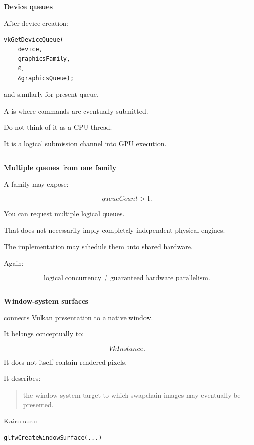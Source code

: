\textbf{Device queues}

After device creation:

\begin{verbatim}
vkGetDeviceQueue(
    device,
    graphicsFamily,
    0,
    &graphicsQueue);
\end{verbatim}

and similarly for present queue.

A  is where commands are eventually submitted.

Do not think of it as a CPU thread.

It is a logical submission channel into GPU execution.

\begin{center}\rule{0.5\linewidth}{0.5pt}\end{center}

\textbf{Multiple queues from one family}

A family may expose:

\[
queueCount>1.
\]

You can request multiple logical queues.

That does not necessarily imply completely independent physical engines.

The implementation may schedule them onto shared hardware.

Again:

\[
\boxed{
\text{logical concurrency}
\neq
\text{guaranteed hardware parallelism}.
}
\]

\begin{center}\rule{0.5\linewidth}{0.5pt}\end{center}

\textbf{Window-system surfaces}

 connects Vulkan presentation to a native window.

It belongs conceptually to:

\[
VkInstance.
\]

It does not itself contain rendered pixels.

It describes:

\begin{quote}
the window-system target to which swapchain images may eventually be presented.
\end{quote}

Kairo uses:

\begin{verbatim}
glfwCreateWindowSurface(...)
\end{verbatim}

